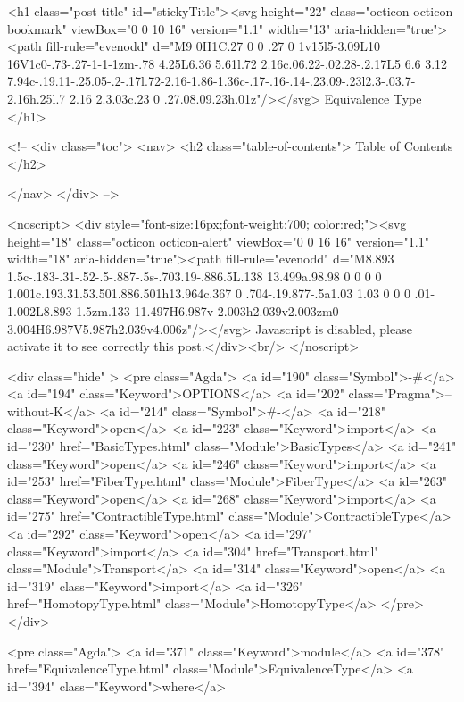   <h1 class="post-title" id="stickyTitle"><svg height="22" class="octicon octicon-bookmark" viewBox="0 0 10 16" version="1.1" width="13" aria-hidden="true"><path fill-rule="evenodd" d="M9 0H1C.27 0 0 .27 0 1v15l5-3.09L10 16V1c0-.73-.27-1-1-1zm-.78 4.25L6.36 5.61l.72 2.16c.06.22-.02.28-.2.17L5 6.6 3.12 7.94c-.19.11-.25.05-.2-.17l.72-2.16-1.86-1.36c-.17-.16-.14-.23.09-.23l2.3-.03.7-2.16h.25l.7 2.16 2.3.03c.23 0 .27.08.09.23h.01z"/></svg> Equivalence Type
  </h1>

  <!-- 
  <div class="toc">
    <nav>
    <h2 class="table-of-contents"> Table of Contents </h2>
      

    </nav>
  </div>
   -->

  <noscript>
  <div style="font-size:16px;font-weight:700; color:red;"><svg height="18" class="octicon octicon-alert" viewBox="0 0 16 16" version="1.1" width="18" aria-hidden="true"><path fill-rule="evenodd" d="M8.893 1.5c-.183-.31-.52-.5-.887-.5s-.703.19-.886.5L.138 13.499a.98.98 0 0 0 0 1.001c.193.31.53.501.886.501h13.964c.367 0 .704-.19.877-.5a1.03 1.03 0 0 0 .01-1.002L8.893 1.5zm.133 11.497H6.987v-2.003h2.039v2.003zm0-3.004H6.987V5.987h2.039v4.006z"/></svg> Javascript is disabled, please activate it to see correctly this post.</div><br/>
  </noscript>

  <div class="hide" >
<pre class="Agda">
<a id="190" class="Symbol">{-#</a> <a id="194" class="Keyword">OPTIONS</a> <a id="202" class="Pragma">--without-K</a> <a id="214" class="Symbol">#-}</a>
<a id="218" class="Keyword">open</a> <a id="223" class="Keyword">import</a> <a id="230" href="BasicTypes.html" class="Module">BasicTypes</a>
<a id="241" class="Keyword">open</a> <a id="246" class="Keyword">import</a> <a id="253" href="FiberType.html" class="Module">FiberType</a>
<a id="263" class="Keyword">open</a> <a id="268" class="Keyword">import</a> <a id="275" href="ContractibleType.html" class="Module">ContractibleType</a>
<a id="292" class="Keyword">open</a> <a id="297" class="Keyword">import</a> <a id="304" href="Transport.html" class="Module">Transport</a>
<a id="314" class="Keyword">open</a> <a id="319" class="Keyword">import</a> <a id="326" href="HomotopyType.html" class="Module">HomotopyType</a>
</pre>
</div>

<pre class="Agda">
<a id="371" class="Keyword">module</a> <a id="378" href="EquivalenceType.html" class="Module">EquivalenceType</a> <a id="394" class="Keyword">where</a>

